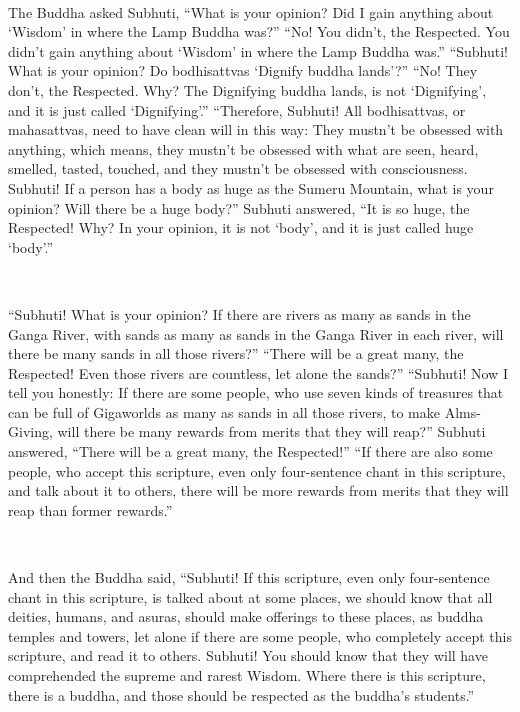 \documentclass[a5paper,12pt]{book}
\begin{document}
    ~

     The Buddha asked Subhuti, ``What is your opinion? Did I gain anything about `Wisdom' in where the Lamp Buddha was?'' ``No! You didn't, the Respected. You didn't gain anything about `Wisdom' in where the Lamp Buddha was.'' ``Subhuti! What is your opinion? Do bodhisattvas `Dignify buddha lands'?'' ``No! They don't, the Respected. Why? The Dignifying buddha lands, is not `Dignifying', and it is just called `Dignifying'.'' ``Therefore, Subhuti! All bodhisattvas, or mahasattvas, need to have clean will in this way: They mustn't be obsessed with anything, which means, they mustn't be obsessed with what are seen, heard, smelled, tasted, touched, and they mustn't be obsessed with consciousness. Subhuti! If a person has a body as huge as the Sumeru Mountain, what is your opinion? Will there be a huge body?'' Subhuti answered, ``It is so huge, the Respected! Why? In your opinion, it is not `body', and it is just called huge `body'.''

    ~

     ``Subhuti! What is your opinion? If there are rivers as many as sands in the Ganga River, with sands as many as sands in the Ganga River in each river, will there be many sands in all those rivers?'' ``There will be a great many, the Respected! Even those rivers are countless, let alone the sands?'' ``Subhuti! Now I tell you honestly: If there are some people, who use seven kinds of treasures that can be full of Gigaworlds as many as sands in all those rivers, to make Alms-Giving, will there be many rewards from merits that they will reap?'' Subhuti answered, ``There will be a great many, the Respected!'' ``If there are also some people, who accept this scripture, even only four-sentence chant in this scripture, and talk about it to others, there will be more rewards from merits that they will reap than former rewards.''

    ~

     And then the Buddha said, ``Subhuti! If this scripture, even only four-sentence chant in this scripture, is talked about at some places, we should know that all deities, humans, and asuras, should make offerings to these places, as buddha temples and towers, let alone if there are some people, who completely accept this scripture, and read it to others. Subhuti! You should know that they will have comprehended the supreme and rarest Wisdom. Where there is this scripture, there is a buddha, and those should be respected as the buddha's students.''
\end{document}
